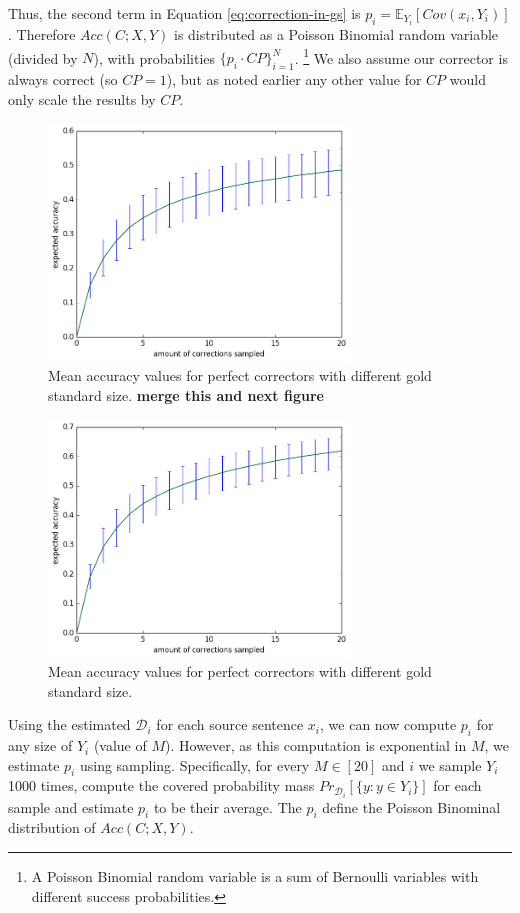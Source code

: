 \documentclass[letter,11pt]{article}
\begin{document}
Thus, the second
term in Equation \ref{eq:correction-in-gs} is $p_i = \mathbb{E}_{Y_i}[Cov(x_i,Y_i)]$. Therefore $Acc(C;X,Y)$ is distributed as
a Poisson Binomial random variable (divided by $N$), with probabilities $\{p_i \cdot CP\}_{i=1}^N$. \footnote{A Poisson Binomial random variable is a sum of Bernoulli variables with different success probabilities.} We also assume our corrector is always correct (so $CP=1$), but as noted earlier any other value for $CP$ would only scale the results by $CP$.

 \begin{figure}
   	\includegraphics[width=8cm]{exact__repeat_1000_accuracy}
 	\caption{Mean accuracy values for perfect correctors with different gold standard size. {\bf merge this and next figure}\label{fig:accuracy_vals}}
 \end{figure}
 \begin{figure}
   	\includegraphics[width=8cm]{index__repeat_1000_accuracy}
   \caption{Mean accuracy values for perfect correctors with different gold standard size.\label{fig:accuracy_vals_ind}}
 \end{figure}

 Using the estimated $\mathcal{D}_i$ for each source sentence $x_i$, we can now compute $p_i$ for any
 size of $Y_i$ (value of $M$). However, as this computation is exponential in $M$, we estimate $p_i$ using
 sampling. Specifically, for every $M\in[20]$ and $i$ we sample $Y_i$ 1000 times, compute 
 the covered probability mass $Pr_{\mathcal{D}_i}[\{y: y \in Y_i\}]$ for each sample and estimate $p_i$ to be their
 average. The $p_i$ define the Poisson Binominal distribution of $Acc(C;X,Y)$.
\end{document}
